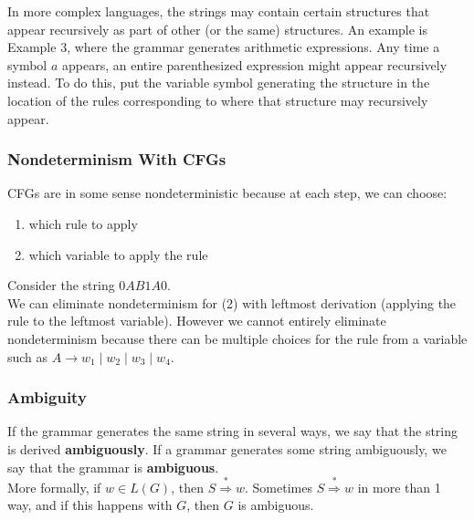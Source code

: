 \documentclass[11pt,a4paper]{article}
\begin{document}
In more complex languages, the strings may contain certain structures that appear recursively as part of other (or the same) structures.
An example is Example 3, where the grammar generates arithmetic expressions. Any time a symbol $a$ appears, an entire parenthesized expression might appear recursively instead.
To do this, put the variable symbol generating the structure in the location of the rules corresponding to where that structure may recursively appear.


\subsubsection{Nondeterminism With CFGs}
CFGs are in some sense nondeterministic because at each step, we can choose:
\begin{enumerate}
    \item which rule to apply
    \item which variable to apply the rule
\end{enumerate}

\begin{example}
    Consider the string $0AB1A0$. \\

    We can eliminate nondeterminism for (2) with leftmost derivation (applying the rule to the leftmost variable).
    However we cannot entirely eliminate nondeterminism because there can be multiple choices for the rule from a variable such as $A\rightarrow w_1\mid w_2\mid w_3\mid w_4$.
\end{example}

\subsubsection{Ambiguity}
If the grammar generates the same string in several ways, we say that the string is derived \textbf{ambiguously}.
If a grammar generates some string ambiguously, we say that the grammar is \textbf{ambiguous}. \\

More formally, if $w\in L(G)$, then $S\stackrel{*}{\Rightarrow}w$. Sometimes $S\stackrel{*}{\Rightarrow}w$ in more than 1 way, and if this happens with $G$, then $G$ is ambiguous. \\
\end{document}
